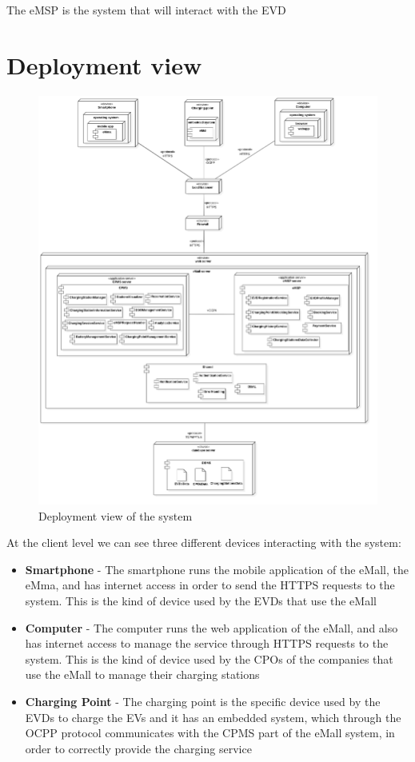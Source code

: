 The eMSP is the system that will interact with the EVD

\section{Deployment view}
\begin{figure}[H]
    \centering
    \includegraphics[width=1\textwidth, height=0.9\textheight]{Images/cp2/DeploymentDiagram.png}
    \caption{Deployment view of the system}
\end{figure}
At the client level we can see three different devices interacting with the system:
\begin{itemize}
    \item \textbf{Smartphone} - The smartphone runs the mobile application of the eMall, the eMma, and has internet access in order to send the HTTPS requests to the system. This is the kind of device used by the EVDs that use the eMall
    \item \textbf{Computer} - The computer runs the web application of the eMall, and also has internet access to manage the service through HTTPS requests to the system. This is the kind of device used by the CPOs of the companies that use the eMall to manage their charging stations
    \item \textbf{Charging Point} - The charging point is the specific device used by the EVDs to charge the EVs and it has an embedded system, which through the OCPP protocol communicates with the CPMS part of the eMall system, in order to correctly provide the charging service
\end{itemize}

